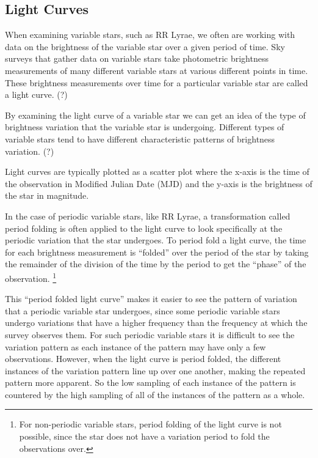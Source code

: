 \documentclass[]{article}
\begin{document}
\subsection{Light Curves}

When examining variable stars, such as RR Lyrae, we often are working with data on the brightness of the variable star over a given period of time. Sky surveys that gather data on variable stars take photometric brightness measurements of many different variable stars at various different points in time. These brightness measurements over time for a particular variable star are called a light curve. (?)

By examining the light curve of a variable star we can get an idea of the type of brightness variation that the variable star is undergoing. Different types of variable stars tend to have different characteristic patterns of brightness variation. (?)

Light curves are typically plotted as a scatter plot where the x-axis is the time of the observation in Modified Julian Date (MJD) and the y-axis is the brightness of the star in magnitude. \cite{AAVSO_nodate}

In the case of periodic variable stars, like RR Lyrae, a transformation called period folding is often applied to the light curve to look specifically at the periodic variation that the star undergoes. To period fold a light curve, the time for each brightness measurement is ``folded'' over the period of the star by taking the remainder of the division of the time by the period to get the “phase” of the observation. \footnote{For non-periodic variable stars, period folding of the light curve is not possible, since the star does not have a variation period to fold the observations over.} \cite{AAVSO_nodate}

This ``period folded light curve'' makes it easier to see the pattern of variation that a periodic variable star undergoes, since some periodic variable stars undergo variations that have a higher frequency than the frequency at which the survey observes them. For such periodic variable stars it is difficult to see the variation pattern as each instance of the pattern may have only a few observations. However, when the light curve is period folded, the different instances of the variation pattern line up over one another, making the repeated pattern more apparent. So the low sampling of each instance of the pattern is countered by the high sampling of all of the instances of the pattern as a whole.
\end{document}
